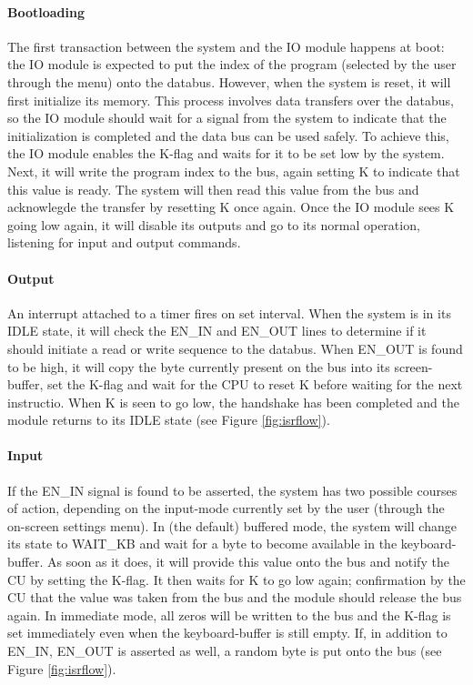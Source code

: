 \paragraph{Bootloading} The first transaction between the system and the IO module happens at boot: the IO module is expected to put the index of the program (selected by the user through the menu) onto the databus. However, when the system is reset, it will first initialize its memory. This process involves data transfers over the databus, so the IO module should wait for a signal from the system to indicate that the initialization is completed and the data bus can be used safely. To achieve this, the IO module enables the K-flag and waits for it to be set low by the system. Next, it will write the program index to the bus, again setting K to indicate that this value is ready. The system will then read this value from the bus and acknowlegde the transfer by resetting K once again. Once the IO module sees K going low again, it will disable its outputs and go to its normal operation, listening for input and output commands.

\paragraph{Output} An interrupt attached to a timer fires on set interval. When the system is in its IDLE state, it will check the EN\_IN and EN\_OUT lines to determine if it should initiate a read or write sequence to the databus. When EN\_OUT is found to be high, it will copy the byte currently present on the bus into its screen-buffer, set the K-flag and wait for the CPU to reset K before waiting for the next instructio. When K is seen to go low, the handshake has been completed and the module returns to its IDLE state (see Figure \ref{fig:isrflow}).

\paragraph{Input} If the EN\_IN signal is found to be asserted, the system has two possible courses of action, depending on the input-mode currently set by the user (through the on-screen settings menu). In (the default) buffered mode, the system will change its state to WAIT\_KB and wait for a byte to become available in the keyboard-buffer. As soon as it does, it will provide this value onto the bus and notify the CU by setting the K-flag. It then waits for K to go low again; confirmation by the CU that the value was taken from the bus and the module should release the bus again. In immediate mode, all zeros will be written to the bus and the K-flag is set immediately even when the keyboard-buffer is still empty. If, in addition to EN\_IN, EN\_OUT is asserted as well, a random byte is put onto the bus (see Figure \ref{fig:isrflow}).

